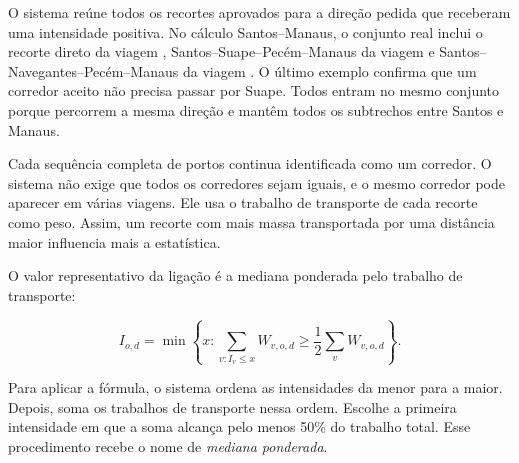 O sistema reúne todos os recortes aprovados para a direção pedida que receberam uma intensidade positiva. No cálculo Santos--Manaus, o conjunto real inclui o recorte direto da viagem , Santos--Suape--Pecém--Manaus da viagem  e Santos--Navegantes--Pecém--Manaus da viagem . O último exemplo confirma que um corredor aceito não precisa passar por Suape. Todos entram no mesmo conjunto porque percorrem a mesma direção e mantêm todos os subtrechos entre Santos e Manaus.

Cada sequência completa de portos continua identificada como um corredor. O sistema não exige que todos os corredores sejam iguais, e o mesmo corredor pode aparecer em várias viagens. Ele usa o trabalho de transporte de cada recorte como peso. Assim, um recorte com mais massa transportada por uma distância maior influencia mais a estatística.

O valor representativo da ligação é a mediana ponderada pelo trabalho de transporte:

\begin{equation}
I_{o,d}=\min\left\{x:\sum_{v:I_v\leq x}W_{v,o,d}\geq
\frac{1}{2}\sum_v W_{v,o,d}\right\}.
\label{eq:mediana-ponderada-intensidade}
\end{equation}

Para aplicar a fórmula, o sistema ordena as intensidades da menor para a maior. Depois, soma os trabalhos de transporte nessa ordem. Escolhe a primeira intensidade em que a soma alcança pelo menos 50\% do trabalho total. Esse procedimento recebe o nome de \emph{mediana ponderada}.


